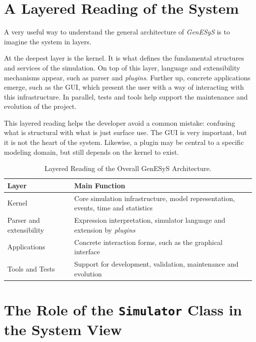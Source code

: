 \section{A Layered Reading of the System}
\label{sec:cap6_leitura_em_camadas}

A very useful way to understand the general architecture of \textit{GenESyS} is to imagine the system in layers.

At the deepest layer is the kernel. It is what defines the fundamental structures and services of the simulation. On top of this layer, language and extensibility mechanisms appear, such as parser and \textit{plugins}. Further up, concrete applications emerge, such as the GUI, which present the user with a way of interacting with this infrastructure. In parallel, tests and tools help support the maintenance and evolution of the project.

This layered reading helps the developer avoid a common mistake: confusing what is structural with what is just surface use. The GUI is very important, but it is not the heart of the system. Likewise, a plugin may be central to a specific modeling domain, but still depends on the kernel to exist.

\begin{table}[htbp]
 \centering
 \caption{Layered Reading of the Overall GenESyS Architecture.}
 \label{tab:cap6_leitura_em_camadas}
 \small
 \begin{tabular}{|p{3.0cm}|p{7.2cm}|}
 \hline
 \textbf{Layer} & \textbf{Main Function} \\
 \hline
 Kernel & Core simulation infrastructure, model representation, events, time and statistics \\
 \hline
 Parser and extensibility & Expression interpretation, simulator language and extension by \textit{plugins} \\
 \hline
 Applications & Concrete interaction forms, such as the graphical interface \\
 \hline
 Tools and Tests & Support for development, validation, maintenance and evolution \\
 \hline
 \end{tabular}
\end{table}

\section{The Role of the \texttt{Simulator} Class in the System View}
\label{sec:cap6_papel_classe_simulator}

